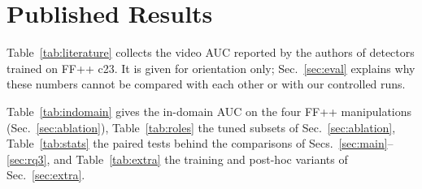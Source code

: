 \documentclass[fonts]{icst}
\begin{document}
\onecolumn
\appendix
\renewcommand{\thesection}{A}\renewcommand{\thetable}{A\arabic{table}}\setcounter{table}{0}
\section{Published Results}
\label{sec:appendix}
Table~\ref{tab:literature} collects the video AUC reported by the authors of detectors trained on FF++ c23. It is given for orientation only; Sec.~\ref{sec:eval} explains why these numbers cannot be compared with each other or with our controlled runs.

\begin{table}[!h]
\centering
\caption{Published video AUC of detectors trained on FF++ c23, as reported by their authors (mostly Table~1 of Effort~\cite{yan2025effort}). Selection rules, frames and seeds differ between rows; the numbers are listed for reference only and are not comparable with Tables~\ref{tab:main}--\ref{tab:perdataM}. $^\dagger$: values reported by Effort.}
\label{tab:literature}
\resizebox{\textwidth}{!}{}
\end{table}

Table~\ref{tab:indomain} gives the in-domain AUC on the four FF++ manipulations (Sec.~\ref{sec:ablation}), Table~\ref{tab:roles} the tuned subsets of Sec.~\ref{sec:ablation}, Table~\ref{tab:stats} the paired tests behind the comparisons of Secs.~\ref{sec:main}--\ref{sec:rq3}, and Table~\ref{tab:extra} the training and post-hoc variants of Sec.~\ref{sec:extra}.

\begin{table}[!h]
\centering
\caption{In-domain video AUC ($\times100$) on the four FF++ manipulations (test split), seed means.}
\label{tab:indomain}
\footnotesize
\end{table}

\begin{table}[!h]
\centering
\caption{Tuned subset inside BiasLN ($L_2$ normalization, cross-entropy). Video AUC, mean $\pm$ std over $n$ seeds.}
\label{tab:roles}
\resizebox{0.7\textwidth}{!}{}
\end{table}


\begin{table}[!h]
\centering
\caption{Paired comparisons over the seeds shared by both schemes. $\Delta$: mean difference A$-$B; $p_{\mathrm{Holm}}$: Holm-corrected over the 14 $t$-tests; $p^{\mathrm{Holm}}_{\mathrm{TOST}}$: Holm-corrected equivalence test ($\pm0.01$ AUC; small means equivalent); wins: seeds where A is better. Bold: $<0.05$.}
\label{tab:stats}
\resizebox{0.9\textwidth}{!}{}
\end{table}
\end{document}
